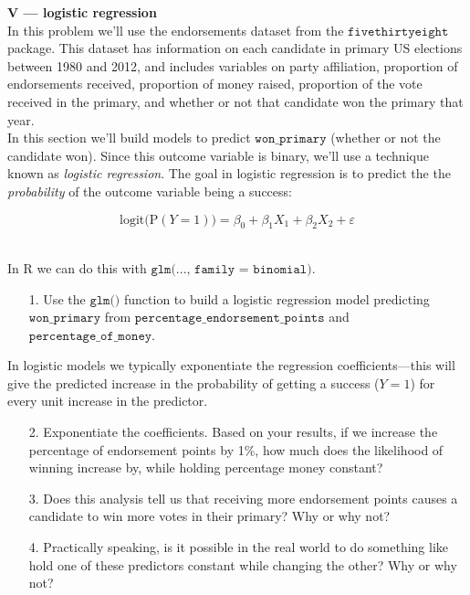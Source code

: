 \documentclass[10pt]{extarticle}
\renewcommand{\P}{\text{P}}
\begin{document}
\hfill 

{\Large \bf V --- logistic regression}  \\

In this problem we'll use the endorsements dataset from the $\texttt{fivethirtyeight}$ package. This dataset has information on each candidate in primary US elections between 1980 and 2012, and includes variables on party affiliation, proportion of endorsements received, proportion of money raised, proportion of the vote received in the primary, and whether or not that candidate won the primary that year. \\ 

In this section we'll build models to predict $\texttt{won}\_\texttt{primary}$ (whether or not the candidate won). Since this outcome variable is binary, we'll use a technique known as {\it logistic regression}. The goal in logistic regression is to predict the the {\it probability} of the outcome variable being a success:

$$\text{logit}\big( \P(Y=1) \big) = \beta_0 + \beta_1 X_1 + \beta_2 X_2 + \varepsilon$$ \ 

In R we can do this with $\texttt{glm(..., family = binomial)}$. \\ 

\begin{itemize}

    \item[1.] Use the $\texttt{glm()}$ function to build a logistic regression model predicting $\texttt{won}\_\texttt{primary}$ from $\texttt{percentage}\_\texttt{endorsement}\_\texttt{points}$ and $\texttt{percentage}\_\texttt{of}\_\texttt{money}$. 
    
\end{itemize}

\hfill 

In logistic models we typically exponentiate the regression coefficients---this will give the predicted increase in the probability of getting a success ($Y=1$) for every unit increase in the predictor. \\ 

\begin{itemize}
    
    \item[2.] Exponentiate the coefficients. Based on your results, if we increase the percentage of endorsement points by 1\%, how much does the likelihood of winning increase by, while holding percentage money constant? \\ 
    
    \item[3.] Does this analysis tell us that receiving more endorsement points causes a candidate to win more votes in their primary? Why or why not? \\ 
    
    \item[4.] Practically speaking, is it possible in the real world to do something like hold one of these predictors constant while changing the other? Why or why not? \\ 
    
\end{itemize}
    
\end{document}
